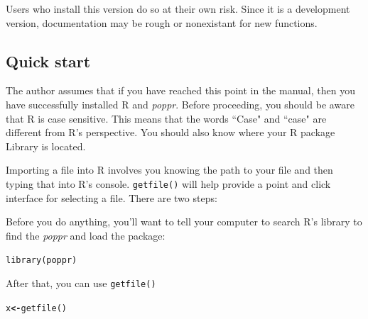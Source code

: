 \documentclass[letterpaper]{article}\usepackage[]{graphicx}\usepackage[]{color}
\makeatletter
\newcommand{\hlstd}[1]{\textcolor[rgb]{0,0,0}{#1}}%
\newcommand{\hlkwb}[1]{\textcolor[rgb]{0.502,0.502,0.753}{\textbf{#1}}}%
\newcommand{\hlkwd}[1]{\textcolor[rgb]{0,0.267,0.4}{#1}}%
\newenvironment{kframe}{%
 \def\at@end@of@kframe{}%
 \ifinner\ifhmode%
  \def\at@end@of@kframe{\end{minipage}}%
  \begin{minipage}{\columnwidth}%
 \fi\fi%
 \def\FrameCommand##1{\hskip\@totalleftmargin \hskip-\fboxsep
 \colorbox{shadecolor}{##1}\hskip-\fboxsep
     \hskip-\linewidth \hskip-\@totalleftmargin \hskip\columnwidth}%
 \MakeFramed {\advance\hsize-\width
   \@totalleftmargin\z@ \linewidth\hsize
   \@setminipage}}%
 {\par\unskip\endMakeFramed%
 \at@end@of@kframe}
\newenvironment{knitrout}{}{} %
\newcommand{\tab}{\hspace*{1em}}
\newcommand{\poppr}{\textit{poppr}}
\makeatother
\begin{document}
Users who install this version do so at their own risk. Since it is a development version, documentation may be rough or nonexistant for new functions. 

%
\subsection{Quick start}
\label{intro:qstart}

\tab\tab The author assumes that if you have reached this point in the manual, then you have successfully installed R and \poppr{}. Before proceeding, you should be aware that R is case sensitive. This means that the words ``Case" and ``case" are different from R's perspective. You should also know where your R package Library is located.
\begin{center}
\end{center}
Importing a file into R involves you knowing the path to your file and then typing that into R's console. \texttt{getfile()} will help provide a point and click interface for selecting a file. There are two steps:


Before you do anything, you'll want to tell your computer to search R's library to find the \poppr{} and load the package:
\begin{knitrout}\footnotesize
{}\color{fgcolor}\begin{kframe}
\begin{alltt}
\hlkwd{library}\hlstd{(poppr)}
\end{alltt}
\end{kframe}
\end{knitrout}

After that, you can use \texttt{getfile()}
\begin{knitrout}\footnotesize
{}\color{fgcolor}\begin{kframe}
\begin{alltt}
\hlstd{x} \hlkwb{<-} \hlkwd{getfile}\hlstd{()}
\end{alltt}
\end{kframe}
\end{knitrout}
\end{document}
